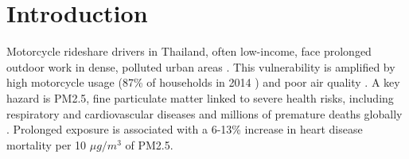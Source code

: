 \section{Introduction}




Motorcycle rideshare drivers in Thailand, often low-income, face prolonged outdoor work in dense, polluted urban areas \cite{tieanklin2024rideshare}.
This vulnerability is amplified by high motorcycle usage (87\% of households in 2014 \cite{Poushter2015motorcyclestat}) and poor air quality \cite{iqr_rank}.
A key hazard is PM2.5, fine particulate matter linked to severe health risks, including respiratory and cardiovascular diseases and millions of premature deaths globally \cite{who_ambient_air_pollution}.
Prolonged exposure is associated with a 6-13\% increase in heart disease mortality per 10 $\mu g/m^3$ of PM2.5.

